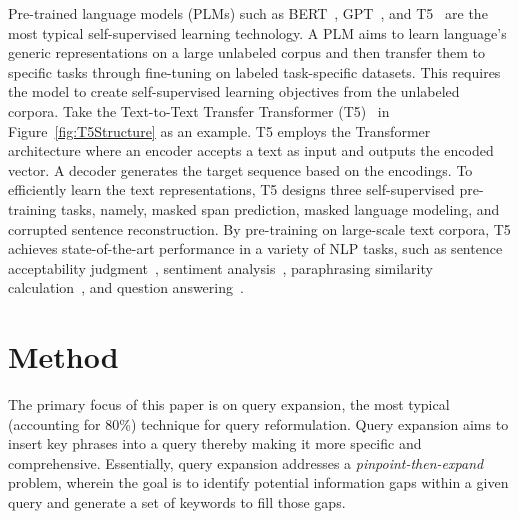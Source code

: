 \documentclass[sigconf,screen]{acmart}
\newcommand{\gu}[1]{\textcolor{blue}{[gu: #1]}}
\newcommand{\wan}[1]{\textcolor{cyan!70!blue}{[Wan: #1]}}
\begin{document}
Pre-trained language models (PLMs) such as BERT~\cite{BERT}, GPT~\cite{GPT}, and T5~\cite{t5} are the most typical self-supervised learning technology. A PLM aims to learn language's generic representations on a large unlabeled corpus and then transfer them to specific tasks through fine-tuning on labeled task-specific datasets. This requires the model to create self-supervised learning objectives from the unlabeled corpora. 
Take the Text-to-Text Transfer Transformer (T5)~\cite{t5} in Figure~\ref{fig:T5Structure} as an example. T5 employs the Transformer~\cite{vaswani2017attention} architecture where an encoder accepts a text as input and outputs the encoded vector. 
A decoder generates the target sequence based on the encodings. To efficiently learn the text representations, T5 designs three self-supervised pre-training tasks, namely, masked span prediction, masked language modeling, and corrupted sentence reconstruction.
By pre-training on large-scale text corpora, T5 achieves state-of-the-art performance in a variety of NLP tasks, such as sentence acceptability judgment~\cite{zomer2021beyond}, sentiment analysis~\cite{pipalia2020comparative}, paraphrasing similarity calculation~\cite{nighojkar2021improving}, and question answering~\cite{jiang2021can}.




\section{Method}

The primary focus of this paper is on query expansion, the most typical (accounting for 80\%) technique for query reformulation. Query expansion aims to insert key phrases into a query thereby making it more specific and comprehensive. %
Essentially, query expansion addresses a \textit{pinpoint-then-expand} problem, wherein the goal is to identify potential information gaps within a given query and generate a set of keywords to fill those gaps. 
\end{document}
